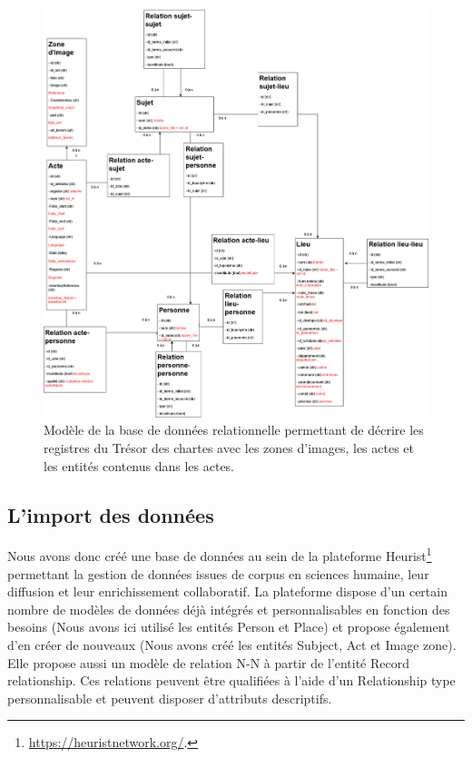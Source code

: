 \documentclass[a4paper,12pt,twoside]{book}
\begin{document}
	\begin{figure}
		\centering
		\includegraphics[width=\textwidth]{Images/modele_bd.png}
		\caption{Modèle de la base de données relationnelle permettant de décrire les registres du Trésor des chartes avec les zones d'images, les actes et les entités contenus dans les actes.}
		\label{Modele_bd}
	\end{figure}
	
	\subsection{L'import des données}
	
	Nous avons donc créé une base de données au sein de la plateforme Heurist\footnote{\url{https://heuristnetwork.org/}.} permettant la gestion de données issues de corpus en sciences humaine, leur diffusion et leur enrichissement collaboratif. La plateforme dispose d'un certain nombre de modèles de données déjà intégrés et personnalisables en fonction des besoins (Nous avons ici utilisé les entités \og Person\fg{} et \og Place\fg{}) et propose également d'en créer de nouveaux (Nous avons créé les entités \og Subject\fg{}, \og Act\fg{} et \og Image zone\fg{}). Elle propose aussi un modèle de relation N-N à partir de l'entité \og Record relationship\fg{}. Ces relations peuvent être qualifiées à l'aide d'un \og Relationship type\fg{} personnalisable et peuvent disposer d'attributs descriptifs.
	
\end{document}
